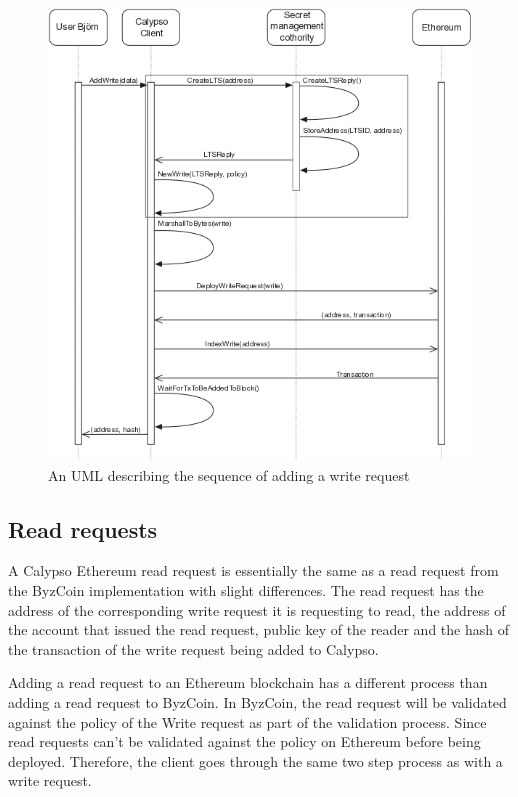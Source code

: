 \documentclass[12pt]{article}
\begin{document}
\begin{figure}[H]
    \centering
    \includegraphics[width=1\textwidth]{NewWriteSequence.png}
    \caption{An UML describing the sequence of adding a write request}
    \label{fig:ReadRequestSequenceDiagram}
\end{figure}

\subsection{Read requests}
A Calypso Ethereum read request is essentially the same as a read request from the ByzCoin implementation with slight differences. The read request has the address of the corresponding write request it is requesting to read, the address of the account that issued the read request, public key of the reader and the hash of the transaction of the write request being added to Calypso.

Adding a read request to an Ethereum blockchain has a different process than adding a read request to ByzCoin. In ByzCoin, the read request will be validated against the policy of the Write request as part of the validation process. Since read requests can’t be validated against the policy on Ethereum before being deployed. Therefore, the client goes through the same two step process as with a write request.
\end{document}
